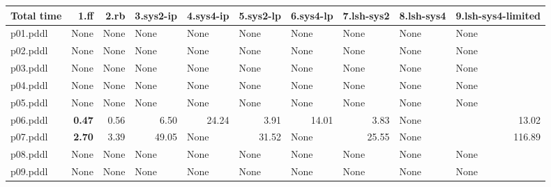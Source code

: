 \documentclass{article}
\begin{document}
\begin{tabular}{@{}lrrrrrrrrr@{}}
Total time & 1.ff & 2.rb & 3.sys2-ip & 4.sys4-ip & 5.sys2-lp & 6.sys4-lp & 7.lsh-sys2 & 8.lsh-sys4 & 9.lsh-sys4-limited \\
\midrule
p01.pddl & \multicolumn{1}{|l|}{None} & \multicolumn{1}{|l|}{None} & \multicolumn{1}{|l|}{None} & \multicolumn{1}{|l|}{None} & \multicolumn{1}{|l|}{None} & \multicolumn{1}{|l|}{None} & \multicolumn{1}{|l|}{None} & \multicolumn{1}{|l|}{None} & \multicolumn{1}{|l|}{None} \\
p02.pddl & \multicolumn{1}{|l|}{None} & \multicolumn{1}{|l|}{None} & \multicolumn{1}{|l|}{None} & \multicolumn{1}{|l|}{None} & \multicolumn{1}{|l|}{None} & \multicolumn{1}{|l|}{None} & \multicolumn{1}{|l|}{None} & \multicolumn{1}{|l|}{None} & \multicolumn{1}{|l|}{None} \\
p03.pddl & \multicolumn{1}{|l|}{None} & \multicolumn{1}{|l|}{None} & \multicolumn{1}{|l|}{None} & \multicolumn{1}{|l|}{None} & \multicolumn{1}{|l|}{None} & \multicolumn{1}{|l|}{None} & \multicolumn{1}{|l|}{None} & \multicolumn{1}{|l|}{None} & \multicolumn{1}{|l|}{None} \\
p04.pddl & \multicolumn{1}{|l|}{None} & \multicolumn{1}{|l|}{None} & \multicolumn{1}{|l|}{None} & \multicolumn{1}{|l|}{None} & \multicolumn{1}{|l|}{None} & \multicolumn{1}{|l|}{None} & \multicolumn{1}{|l|}{None} & \multicolumn{1}{|l|}{None} & \multicolumn{1}{|l|}{None} \\
p05.pddl & \multicolumn{1}{|l|}{None} & \multicolumn{1}{|l|}{None} & \multicolumn{1}{|l|}{None} & \multicolumn{1}{|l|}{None} & \multicolumn{1}{|l|}{None} & \multicolumn{1}{|l|}{None} & \multicolumn{1}{|l|}{None} & \multicolumn{1}{|l|}{None} & \multicolumn{1}{|l|}{None} \\
p06.pddl & \textbf{0.47} & 0.56 & 6.50 & 24.24 & 3.91 & 14.01 & 3.83 & \multicolumn{1}{|l|}{None} & 13.02 \\
p07.pddl & \textbf{2.70} & 3.39 & 49.05 & \multicolumn{1}{|l|}{None} & 31.52 & \multicolumn{1}{|l|}{None} & 25.55 & \multicolumn{1}{|l|}{None} & 116.89 \\
p08.pddl & \multicolumn{1}{|l|}{None} & \multicolumn{1}{|l|}{None} & \multicolumn{1}{|l|}{None} & \multicolumn{1}{|l|}{None} & \multicolumn{1}{|l|}{None} & \multicolumn{1}{|l|}{None} & \multicolumn{1}{|l|}{None} & \multicolumn{1}{|l|}{None} & \multicolumn{1}{|l|}{None} \\
p09.pddl & \multicolumn{1}{|l|}{None} & \multicolumn{1}{|l|}{None} & \multicolumn{1}{|l|}{None} & \multicolumn{1}{|l|}{None} & \multicolumn{1}{|l|}{None} & \multicolumn{1}{|l|}{None} & \multicolumn{1}{|l|}{None} & \multicolumn{1}{|l|}{None} & \multicolumn{1}{|l|}{None} \\

\end{tabular}
\end{document}
